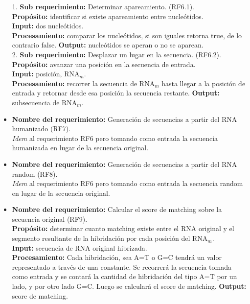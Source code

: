 \documentclass[12pt,a4paper,spanish]{article}
\begin{document}
\begin{itemize}
		1. \textbf{Sub requerimiento:} Determinar apareamiento. (RF6.1).\\
 	    \textbf{Propósito:}  identificar si existe apareamiento entre nucleótidos. \\
		\textbf{Input:} dos nucleótidos. \\
		\textbf{Procesamiento:} comparar los nucleótidos, si son iguales retorna true, de lo contrario false.
		\textbf{Output:} nucleótidos se aperan o no se aparean.\\

		2. \textbf{Sub requerimiento:} Desplazar un lugar en la secuencia. (RF6.2).\\
 	    \textbf{Propósito:} avanzar una posición en la secuencia de entrada. \\
		\textbf{Input:} posición, RNA$_m$. \\
		\textbf{Procesamiento:} recorrer la secuencia de RNA$_m$ hasta llegar a la posición de entrada y retornar desde esa posición la secuencia restante.
		\textbf{Output:} subsecuencia de RNA$_m$. \\

		\item \textbf{Nombre del requerimiento:}  Generación de secuencias a partir del RNA humanizado (RF7).\\
		\textit{Idem} al requerimiento RF6 pero tomando como entrada la secuencia humanizada en lugar de la secuencia original. \\

		\item \textbf{Nombre del requerimiento:} Generación de secuencias a partir del RNA random (RF8).\\
		\textit{Idem} al requerimiento RF6 pero tomando como entrada la secuencia random en lugar de la secuencia original. \\

		\item \textbf{Nombre del requerimiento:} Calcular el score de matching sobre la secuencia original (RF9).\\
 	    \textbf{Propósito:} determinar cuanto matching existe entre el RNA original y el segmento resultante 
							de la hibridación por cada posición del RNA$_m$.\\
		\textbf{Input:} secuencia de RNA original hibrizada. \\
		\textbf{Procesamiento:} Cada hibridación, sea A=T o G=C tendrá un valor representado a través de una constante. Se recorrerá la secuencia tomada 									como entrada y se contará la cantidad de hibridación del tipo A=T por un lado, y por otro lado G=C. Luego se calculará 									el score de matching. 								
		\textbf{Output:} score de matching.\\


\end{itemize}
\end{document}
